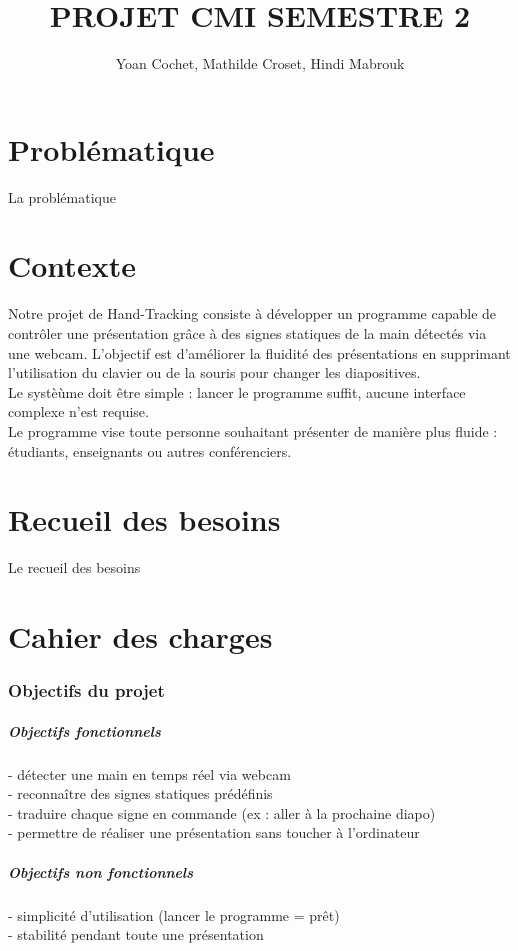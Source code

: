 \documentclass{article}
\begin{document}
\title{PROJET CMI SEMESTRE 2}	
\author{Yoan Cochet, Mathilde Croset, Hindi Mabrouk}
\maketitle

\part*{Problématique}
La problématique
\part*{Contexte}
Notre projet de Hand-Tracking consiste à développer un programme capable de contrôler une présentation grâce à des signes statiques de la main détectés via une webcam. L'objectif est d'améliorer la fluidité des présentations en supprimant l'utilisation du clavier ou de la souris pour changer les diapositives. \\
Le systèùme doit être simple : lancer le programme suffit, aucune interface complexe n'est requise. \\
Le programme vise toute personne souhaitant présenter de manière plus fluide : étudiants, enseignants ou autres conférenciers.
\part*{Recueil des besoins}
Le recueil des besoins
\part*{Cahier des charges}
\section{Objectifs du projet}
\subsubsection*{Objectifs fonctionnels}
- détecter une main en temps réel via webcam \\
- reconnaître des signes statiques prédéfinis \\
- traduire chaque signe en commande (ex : aller à la prochaine diapo) \\
- permettre de réaliser une présentation sans toucher à l'ordinateur \\
\subsubsection*{Objectifs non fonctionnels}
- simplicité d'utilisation (lancer le programme = prêt) \\
- stabilité pendant toute une présentation \\
\end{document}
